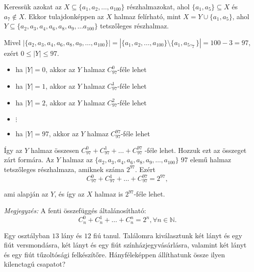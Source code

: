 \begin{solution}
Keressük azokat az $X\subseteq\{a_{1},a_{2},\ldots,a_{100}\}$ részhalmazokat,
ahol $\{a_{1},a_{5}\}\subseteq X$ és $a_{7}\notin X$. Ekkor tulajdonképpen
az $X$ halmaz felírható, mint $X=Y\cup\{a_{1},a_{5}\}$, ahol $Y\subseteq\{a_{2},a_{3},a_{4},a_{6},a_{8},a_{9},\ldots a_{100}\}$
tetszőleges részhalmaz.

Mivel $|\{a_{2},a_{3},a_{4},a_{6},a_{8},a_{9},\ldots,a_{100}\}|=|\{a_{1},a_{2},\ldots,a_{100}\}\setminus\{a_{1},a_{5},_{7}\}|=100-3=97$,
ezért $0\leq|Y|\leq97$. 
\begin{itemize}
\item ha $|Y|=0$, akkor az $Y$ halmaz $C_{97}^{0}$-féle lehet 
\item ha $|Y|=1$, akkor az $Y$ halmaz $C_{97}^{1}$-féle lehet 
\item ha $|Y|=2$, akkor az $Y$ halmaz $C_{97}^{2}$-féle lehet 
\item $\vdots$ 
\item ha $|Y|=97$, akkor az $Y$ halmaz $C_{97}^{97}$-féle lehet 
\end{itemize}
Így az $Y$ halmaz összesen $C_{97}^{0}+C_{97}^{1}+\ldots+C_{97}^{97}$
-féle lehet. Hozzuk ezt az összeget zárt formára. Az $Y$ halmaz az
$\{a_{2},a_{3},a_{4},a_{6},a_{8},a_{9},\ldots,a_{100}\}$ $97$ elemű
halmaz tetszőleges részhalmaza, amiknek száma $2^{97}$. Ezért 
\[
C_{97}^{0}+C_{97}^{1}+\ldots+C_{97}^{97}=2^{97},
\]

ami alapján az $Y$, és így az $X$ halmaz is $2^{97}$-féle lehet.

\textit{Megjegyzés:} A fenti összefüggés általánosítható: 
\[
C_{n}^{0}+C_{n}^{1}+\ldots+C_{n}^{n}=2^{n},\forall n\in\mathbb{N}.
\]
\end{solution}
\begin{problem}
Egy osztályban $13$ lány és $12$ fiú tanul. Találomra kiválasztunk
két lányt és egy fiút versmondásra, két lányt és egy fiút színházjegyvásárlásra,
valamint két lányt és egy fiút tűzoltósági felkészítőre. Hányféleképpen
állíthatunk össze ilyen kilenctagú csapatot? 
\end{problem}

